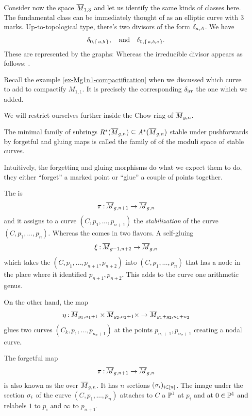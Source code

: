 \documentclass[12pt]{memoir}
\begin{document}
\begin{Ex}
    Consider now the space $\overline M_{1,3}$ and let us identify the same kinds of classes here. The fundamental class can be immediately thought of as an elliptic curve with 3 marks. Up-to-topological type, there's two divisors of the form $\delta_{a,A}$. We have 
    $$\delta_{0,\{\,a,b\,\}},\quad\text{and}\quad\delta_{0,\{\,a,b,c\,\}}.$$ 
    These are represented by the graphs:
    Whereas the irreducible divisor appears as follows: .
\end{Ex}

\begin{Rmk}
    Recall the example \ref{ex-Mg1n1-compactification} when we discussed which curve to add to compactify $M_{1,1}$. It is precisely the corresponding $\delta_{\text{irr}}$ the one which we added.
\end{Rmk}

We will restrict ourselves further inside the Chow ring of $\overline M_{g,n}$. 

\begin{Def}
The minimal family of subrings $R^\ast(\overline M_{g,n})\subseteq A^\ast(\overline M_{g,n})$ stable under pushforwards by forgetful and gluing maps is called the family of  of the moduli space of stable curves.
\end{Def}

Intuitively, the forgetting and gluing morphisms do what we expect them to do, they either ``forget'' a marked point or ``glue'' a couple of points together.  

\begin{Def}
    The  is 
    $$\pi\mathbin{:}\overline M_{g,n+1}\to\overline M_{g,n}$$ 
    and it assigns to a curve $(C,p_1,\dots,p_{n+1})$ the \emph{stabilization} of the curve $(C,p_1,\dots,p_n)$. Whereas the  comes in two flavors. A self-gluing 
    $$\xi\mathbin{:}\overline M_{g-1,n+2}\to\overline M_{g,n}$$
    which takes the $(C,p_1,\dots,p_{n+1},p_{n+2})$ into $(C,p_1,\dots,p_n)$ that has a node in the place where it identified $p_{n+1},p_{n+2}$. This adds to the curve one arithmetic genus.\par
    On the other hand, the map 
    $$\eta\mathbin{:}\overline M_{g_1,n_1+1}\times\overline M_{g_2,n_2+1}\times\to\overline M_{g_1+g_2,n_1+n_2}$$
    glues two curves $(C_k,p_1,\dots,p_{n_k+1})$ at the points $p_{n_1+1},p_{n_2+1}$ creating a nodal curve.
\end{Def}

\begin{Rmk}
    The forgetful map 
    $$\pi\mathbin{:}\overline M_{g,n+1}\to\overline M_{g,n}$$ 
    is also known as the  over $\overline M_{g,n}$. It has $n$ sections $(\sigma_i)_{i\in \left\lbrack n\right\rbrack}$. The image under the section $\sigma_i$ of the curve $(C,p_1,\dots, p_n)$ attaches to $C$ a $\mathbb{P}^1$ at $p_i$ and at $0\in\mathbb{P}^1$ and relabels $1$ to $p_i$ and $\infty$ to $p_{n+1}$.
\end{Rmk}
\end{document}
